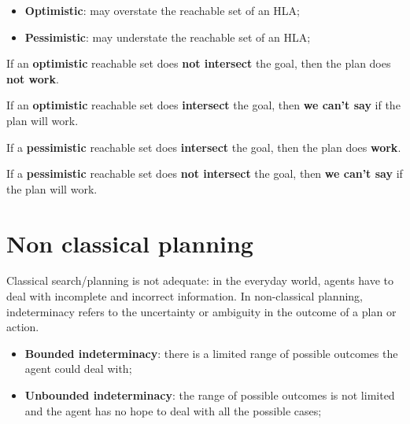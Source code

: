 \documentclass{article}
\begin{document}
\begin{itemize}
    \item \textbf{Optimistic}: may overstate the reachable set of an HLA;
    \item \textbf{Pessimistic}: may understate the reachable set of an HLA;
\end{itemize}

\begin{flushleft}
If an \textbf{optimistic} reachable set does \textbf{not intersect} the goal, then the plan does \textbf{not work}. \\
\end{flushleft}

\begin{flushleft}
If an \textbf{optimistic} reachable set does \textbf{intersect} the goal, then \textbf{we can't say} if the plan will work. \\
\end{flushleft}

\begin{flushleft}
If a \textbf{pessimistic} reachable set does \textbf{intersect} the goal, then the plan does \textbf{work}. \\
\end{flushleft}

\begin{flushleft}
If a \textbf{pessimistic} reachable set does \textbf{not intersect} the goal, then \textbf{we can't say} if the plan will work. \\
\end{flushleft}

\newpage

\section{Non classical planning}

Classical search/planning is not adequate: in the everyday world, agents have to deal with incomplete and incorrect information.
In non-classical planning, indeterminacy refers to the uncertainty or ambiguity in the outcome of a plan or action. 

\begin{itemize}
    \item \textbf{Bounded indeterminacy}: there is a limited range of possible outcomes the agent could deal with;
    \item \textbf{Unbounded indeterminacy}: the range of possible outcomes is not limited and the agent has no hope to deal with all the possible cases;
\end{itemize}
\end{document}
